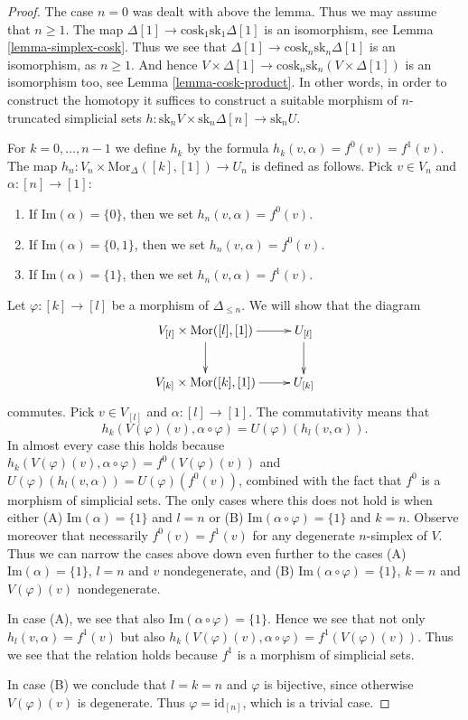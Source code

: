 \begin{proof}
The case $n = 0$ was dealt with above the lemma.
Thus we may assume that $n \geq 1$.
The map $\Delta[1] \to \text{cosk}_1 \text{sk}_1 \Delta[1]$
is an isomorphism, see Lemma \ref{lemma-simplex-cosk}.
Thus we see that $\Delta[1] \to \text{cosk}_n \text{sk}_n \Delta[1]$
is an isomorphism, as $n \geq 1$. And hence $V \times \Delta[1] \to
\text{cosk}_n \text{sk}_n (V \times \Delta[1])$
is an isomorphism too, see Lemma \ref{lemma-cosk-product}.
In other words, in order to construct the homotopy
it suffices to construct a suitable
morphism of $n$-truncated simplicial sets
$h : \text{sk}_n V \times \text{sk}_n \Delta[n] \to \text{sk}_n U$.

\medskip\noindent
For $k = 0, \ldots, n - 1$ we define $h_k$ by the
formula $h_k(v, \alpha) = f^0(v) = f^1(v)$.
The map $h_n : V_n \times \text{Mor}_{\Delta}([k], [1]) \to U_n$
is defined as follows. Pick $v \in V_n$ and $\alpha : [n] \to [1]$:
\begin{enumerate}
\item If $\text{Im}(\alpha) = \{0\}$, then we set $h_n(v, \alpha) = f^0(v)$.
\item If $\text{Im}(\alpha) = \{0, 1\}$, then we set $h_n(v, \alpha) = f^0(v)$.
\item If $\text{Im}(\alpha) = \{1\}$, then we set $h_n(v, \alpha) = f^1(v)$.
\end{enumerate}
Let $\varphi : [k] \to [l]$ be a morphism of $\Delta_{\leq n}$.
We will show that the diagram
$$
\xymatrix{
V_{[l]} \times \text{Mor}([l], [1]) \ar[r] \ar[d] &
U_{[l]} \ar[d] \\
V_{[k]} \times \text{Mor}([k], [1]) \ar[r] &
U_{[k]}
}
$$
commutes.
Pick $v \in V_{[l]}$ and $\alpha : [l] \to [1]$.
The commutativity means that
$$
h_k(V(\varphi)(v), \alpha \circ \varphi)
=
U(\varphi)(h_l(v, \alpha)).
$$
In almost every case this holds because
$h_k(V(\varphi)(v), \alpha \circ \varphi) = f^0(V(\varphi)(v))$
and $U(\varphi)(h_l(v, \alpha)) = U(\varphi)(f^0(v))$, combined
with the fact that $f^0$ is a morphism of simplicial sets.
The only cases where this does not hold is when
either (A) $\text{Im}(\alpha) = \{1\}$ and $l = n$
or (B) $\text{Im}(\alpha \circ \varphi) = \{1\}$ and $k = n$.
Observe moreover that necessarily $f^0(v) = f^1(v)$
for any degenerate $n$-simplex of $V$.
Thus we can narrow the cases above down even further
to the cases (A) $\text{Im}(\alpha) = \{1\}$, $l = n$
and $v$ nondegenerate, and (B)
$\text{Im}(\alpha \circ \varphi) = \{1\}$, $k = n$
and $V(\varphi)(v)$ nondegenerate.

\medskip\noindent
In case (A), we see that also $\text{Im}(\alpha \circ \varphi) = \{1\}$.
Hence we see that not only $h_l(v, \alpha) = f^1(v)$ but also
$h_k(V(\varphi)(v), \alpha \circ \varphi) = f^1(V(\varphi)(v))$.
Thus we see that the relation holds because $f^1$ is a morphism
of simplicial sets.

\medskip\noindent
In case (B) we conclude that $l = k = n$ and
$\varphi$ is bijective, since otherwise $V(\varphi)(v)$
is degenerate. Thus $\varphi = \text{id}_{[n]}$, which is a trivial case.
\end{proof}

